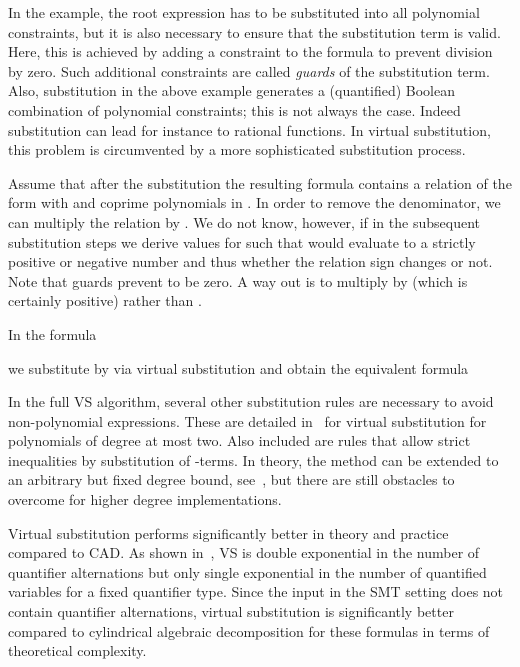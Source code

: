 \documentclass{llncs}
\begin{document}
In the example, the root expression has to be substituted into all polynomial
constraints, but it is also necessary to ensure that the substitution term is
valid. Here, this is achieved by adding a constraint to the formula to prevent
division by zero. Such additional constraints are called \textit{guards} of the
substitution term.  Also, substitution in the above example generates a
(quantified) Boolean combination of polynomial constraints; this is not always
the case.  Indeed substitution can lead for instance to rational functions.  In
virtual substitution, this problem is circumvented by a more sophisticated
substitution process.

Assume that after the substitution the resulting formula contains a relation of
the form  with  and  coprime polynomials in . In order to remove the denominator, we can multiply the
relation by . We do not know, however, if in the subsequent substitution
steps we derive values for  such that  would evaluate to a
strictly positive or negative number and thus whether the relation sign
 changes or not.  Note that guards prevent  to be zero.  A way out
is to multiply by  (which is certainly positive) rather than .

\begin{example}
In the formula 
   
we substitute  by  via virtual substitution and obtain the
equivalent formula
  
\end{example}

In the full VS algorithm, several other substitution rules are necessary to
avoid non-polynomial expressions. These are detailed in~\cite{weispfenning} for
virtual substitution for polynomials of degree at most two.  Also included are
rules that allow strict inequalities by substitution of -terms.  In
theory, the method can be extended to an arbitrary but fixed degree bound,
see~\cite{weispfenning3}, but there are still obstacles to overcome for higher
degree implementations.

Virtual substitution performs significantly better in theory and practice
compared to CAD. As shown in~\cite{weispfenning4}, VS is double exponential in
the number of quantifier alternations but only single exponential in the number
of quantified variables for a fixed quantifier type. Since the input in the SMT
setting does not contain quantifier alternations, virtual substitution is
significantly better compared to cylindrical algebraic decomposition for these
formulas in terms of theoretical complexity.
\end{document}
